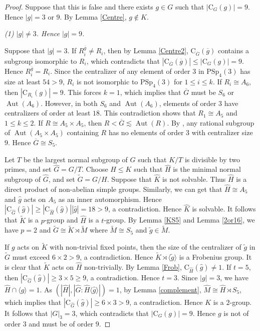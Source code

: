 \documentclass[11pt]{article}
\providecommand{\PSp}{{\mathrm{PSp}}}
\providecommand{\C}{{\mathrm{C}}}
\providecommand{\Aut}{{\operatorname{Aut}}}
\providecommand{\gen}[1]{\langle #1 \rangle} %
\providecommand{\gen}[1]{\langle #1 \rangle} %
\providecommand{\gen}[1]{\langle #1 \rangle} %
\providecommand{\olg}{{\overline{g}}}
\providecommand{\olG}{{\overline{G}}}
\providecommand{\wtg}{{\widetilde{g}}}
\providecommand{\wtG}{{\widetilde{G}}}
\providecommand{\wtK}{{\widetilde{K}}}
\providecommand{\wtM}{{\widetilde{M}}}
\providecommand{\whg}{{\widehat{g}}}
\providecommand{\whG}{{\widehat{G}}}
\providecommand{\whH}{{\widehat{H}}}
\providecommand{\whK}{{\widehat{K}}}
\providecommand{\whM}{{\widehat{M}}}
\begin{document}
\begin{proof}
    Suppose that this is false and there exists $g\in G$ such that $|\C_G(g)|=9$.
    Hence $|g|=3$ or $9$.
    By Lemma \ref{Centre}, $g\notin K$.

\medskip
{\sl (1) $|g|\neq 3$. Hence $|g|=9$.}

    Suppose that $|g|=3$.
    If $R_i^{\olg}\neq R_i$, then by Lemma \ref{Centre2},
    $\C_{\olG}(\olg)$ contains a subgroup isomorphic to $R_i$,
    which contradicts that $|\C_{\olG}(\olg)|\leq |\C_G(g)|=9$.
    Hence $R_i^{\olg}=R_i$.
	    Since the centralizer of any element of order $3$ in $\PSp_4(3)$ has size at least $54>9$,
	    $R_i$ is not isomorphic to $\PSp_4(3)$ for $1\leq i \leq k$.
    If $R_i\cong A_6$, then $|\C_{R_i}(g)|=9$. 
    This forces $k=1$, which implies that $\olG$ must be $S_6$ or $\Aut(A_6)$.
    However, in both $S_6$ and $\Aut(A_6)$, 
    elements of order $3$ have centralizers of order at least $18$.
    This contradiction shows that $R_1\cong A_5$ and $1\leq k\leq 2$.
    If $R\cong A_5\times A_5$, then $R<\olG \lesssim \Aut(R)$.
    By \cite[Code 3]{Git}, any rational subgroup of $\Aut(A_5 \times A_5)$ containing $R$ has no elements of order $3$ with centralizer size $9$.
    Hence $\olG \cong S_5$.

    Let $T$ be the largest normal subgroup of $G$ such that $K/T$ is divisible by two primes, and set $\whG=G/T$.
    Choose $H\leq K$ such that $\whH$ is the minimal normal subgroup of $\whG$,
    and set $\wtG=G/H$.
    Suppose that $\whK$ is not solvable. 
    Thus $\whH$ is a direct product of non-abelian simple groups.
    Similarly, we can get that $\whH \cong A_5$ and $\whg$ acts on $A_5$ as an inner automorphism. 
    Hence $|\C_{\whG}(\whg)|\geq |\C_{\whH}(\whg)||\whg|=18>9$, a contradiction.
    Hence $\whK$ is solvable. 
    It follows that $\wtK$ is a $p$-group and $\whH$ is a $t$-group.
    By Lemma \ref{KS5} and Lemma \ref{2or16}, 
    we have $p=2$ and $\wtG\cong \wtK \rtimes \wtM$ where $\wtM \cong S_5$ and $\wtg \in \wtM$.

    If $g$ acts on $\wtK$ with non-trivial fixed points, 
    then the size of the centralizer of $\wtg$ in $\wtG$ must exceed $6\times 2>9$,
    a contradiction.
    Hence $\wtK\rtimes \gen{\wtg}$ is a Frobenius group.
    It is clear that $\wtK$ acts on $\whH$ non-trivially.
    By Lemma \ref{Frob}, $\C_{\whH}(\whg)\neq 1$.
    If $t=5$, then $|\C_{\whG}(\whg)|\geq 3\times 5\geq 9$, a contradiction.
    Hence $t=3$. 
    Since $|g|=3$, we have $\whH\cap \gen{\whg}=1$.
    As $(|\whH|,|\whG: \whH\gen{\whg}|)=1$,
    by Lemma \ref{complement}, $\whM\cong \whH\rtimes S_5$, 
    which implies that $|\C_{\whG}(\whg)|\geq 6\times 3>9$, a contradiction.
    Hence $K$ is a $2$-group.
    It follows that $|G|_3=3$, which contradicts that $|\C_G(g)|=9$.
    Hence $g$ is not of order $3$ and must be of order $9$.


\end{proof}
\end{document}
